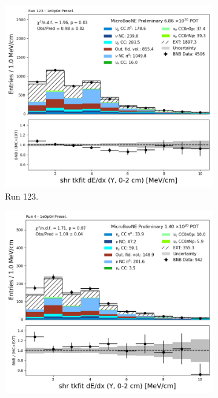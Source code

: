 \begin{figure}[H]
    \centering
    \begin{subfigure}[t]{0.32\linewidth}
        \includegraphics[width=\linewidth]{technote/Appendix_Preselection/Figures/1e0p0pi/Run123/shr_tkfit_2cm_dedx_Y_Run123_1e0p0pi_Presel.png}
        \caption{Run 123.}
    \end{subfigure}%
    \hspace{0.2cm}%
    \begin{subfigure}[t]{0.32\linewidth}
        \includegraphics[width=\linewidth]{technote/Appendix_Preselection/Figures/1e0p0pi/Run4b/shr_tkfit_2cm_dedx_Y_Run4b_1e0p0pi_Presel.png}

\end{subfigure}
\end{figure}
